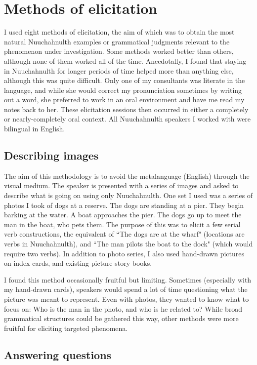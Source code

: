 \section{Methods of elicitation}

I used eight methods of elicitation, the aim of which was to obtain the most natural Nuuchahnulth examples or grammatical judgments relevant to the phenomenon under investigation. Some methods worked better than others, although none of them worked all of the time. Anecdotally, I found that staying in Nuuchahnulth for longer periods of time helped more than anything else, although this was quite difficult. Only one of my consultants was literate in the language, and while she would correct my pronunciation sometimes by writing out a word, she preferred to work in an oral environment and have me read my notes back to her. These elicitation sessions then occurred in either a completely or nearly-completely oral context. All Nuuchahnulth speakers I worked with were bilingual in English.

\subsection{Describing images}

The aim of this methodology is to avoid the metalanguage (English) through the visual medium. The speaker is presented with a series of images and asked to describe what is going on using only Nuuchahnulth. One set I used was a series of photos I took of dogs at a reserve. The dogs are standing at a pier. They begin barking at the water. A boat approaches the pier. The dogs go up to meet the man in the boat, who pets them. The purpose of this was to elicit a few serial verb constructions, the equivalent of ``The dogs are at the wharf" (locations are verbs in Nuuchahnulth), and ``The man pilots the boat to the dock" (which would require two verbs). In addition to photo series, I also used hand-drawn pictures on index cards, and existing picture-story books.

I found this method occasionally fruitful but limiting. Sometimes (especially with my hand-drawn cards), speakers would spend a lot of time questioning what the picture was meant to represent. Even with photos, they wanted to know what to focus on: Who is the man in the photo, and who is he related to? While broad grammatical structures could be gathered this way, other methods were more fruitful for eliciting targeted phenomena.

\subsection{Answering questions}

